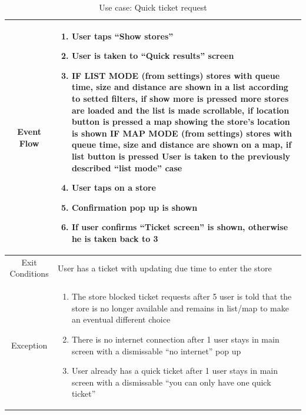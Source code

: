 \begin{enumerate}
\begin{table}[H]
{\begin{tabular}{|c|p{14cm}|}
		Event Flow & \begin{enumerate}
			\item User taps “Show stores”
			\item User is taken to “Quick results” screen
			\item IF LIST MODE (from settings)\newline
			stores with queue time, size and distance are shown in a list according to setted filters, if show more is pressed more stores are loaded and the list is made scrollable, if location button is pressed a map showing the store’s location is shown \newline
			IF MAP MODE (from settings\newline)
			stores with queue time, size and distance are shown on a map, if list button is pressed User is taken to the previously described “list mode” case
			\item User taps on a store
			\item Confirmation pop up is shown
			\item If user confirms “Ticket screen” is shown, otherwise he is taken back to 3
		\end{enumerate}\\
	
		\hline
		Exit Conditions & User has a ticket with updating due time to enter the store\\
		\hline
		
		Exception & \begin{enumerate}
			\item The store blocked ticket requests\newline
			after 5 user is told that the store is no longer available and remains in list/map to make an eventual different choice
			
			\item There is no internet connection\newline
			after 1 user stays in main screen with a dismissable “no internet” pop up
			
			\item User already has a quick ticket\newline
			after 1 user stays in main screen with a dismissable “you can only have one quick ticket” 
			
		\end{enumerate}\\
		
		\hline
	\end{tabular}
}
	\label{tab:UCQuick}
	\caption{Use case: Quick ticket request}
\end{table}


\end{enumerate}
